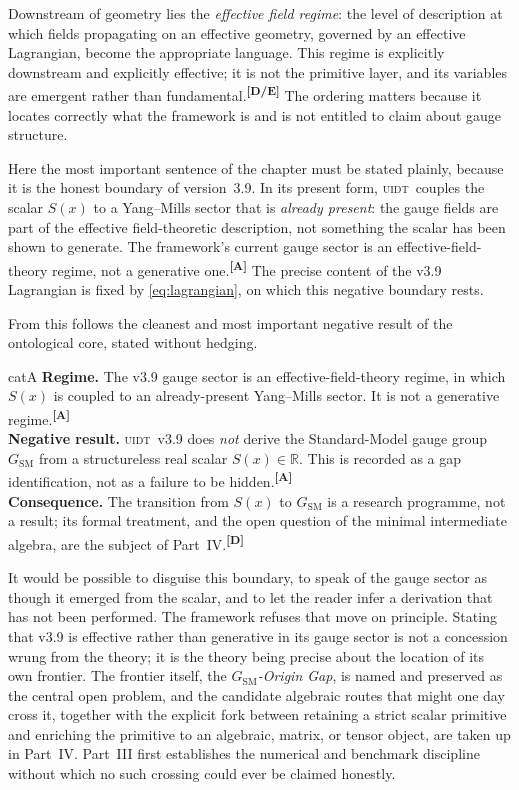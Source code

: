 \documentclass[12pt,a4paper,twoside]{article}
\theoremstyle{plain}
\theoremstyle{definition}
\theoremstyle{remark}
\newcommand{\UIDT}{\textsc{uidt}}
\newcommand{\catmark}[1]{\textsuperscript{\textsf{\textbf{[#1]}}}}
\begin{document}
Downstream of geometry lies the \emph{effective field regime}: the level of description at which fields propagating on an effective geometry, governed by an effective Lagrangian, become the appropriate language. This regime is explicitly downstream and explicitly effective; it is not the primitive layer, and its variables are emergent rather than fundamental.\catmark{D/E} The ordering matters because it locates correctly what the framework is and is not entitled to claim about gauge structure.

Here the most important sentence of the chapter must be stated plainly, because it is the honest boundary of version~3.9. In its present form, \UIDT\ couples the scalar $S(x)$ to a Yang--Mills sector that is \emph{already present}: the gauge fields are part of the effective field-theoretic description, not something the scalar has been shown to generate. The framework's current gauge sector is an effective-field-theory regime, not a generative one.\catmark{A} The precise content of the v3.9 Lagrangian is fixed by \cref{eq:lagrangian}, on which this negative boundary rests.

From this follows the cleanest and most important negative result of the ontological core, stated without hedging.

\begin{evidencebox}{catA}
\textbf{Regime.} The v3.9 gauge sector is an effective-field-theory regime, in which $S(x)$ is coupled to an already-present Yang--Mills sector. It is not a
generative regime.\catmark{A}\\[0.3em]
\textbf{Negative result.} \UIDT\ v3.9 does \emph{not} derive the Standard-Model gauge group $G_{\mathrm{SM}}$ from a structureless real scalar $S(x)\in\mathbb{R}$. This is recorded as a gap identification, not as a
failure to be hidden.\catmark{A}\\[0.3em]
\textbf{Consequence.} The transition from $S(x)$ to $G_{\mathrm{SM}}$ is a research programme, not a result; its formal treatment, and the open question of the minimal intermediate algebra, are the subject of Part~IV.\catmark{D}
\end{evidencebox}

\noindent It would be possible to disguise this boundary, to speak of the gauge sector as though it emerged from the scalar, and to let the reader infer a derivation that has not been performed. The framework refuses that move on principle. Stating that v3.9 is effective rather than generative in its gauge sector is not a concession wrung from the theory; it is the theory being precise about the location of its own frontier. The frontier itself, the \emph{$G_{\mathrm{SM}}$-Origin Gap}, is named and preserved as the central open problem, and the candidate algebraic routes that might one day cross it, together with the explicit fork between retaining a strict scalar primitive and enriching the primitive to an algebraic, matrix, or tensor object, are taken up in Part~IV. Part~III first establishes the numerical and benchmark discipline without which no such crossing could ever be claimed honestly.
\end{document}
